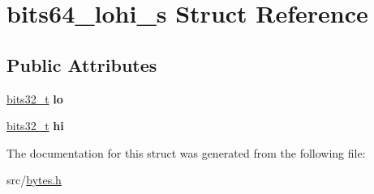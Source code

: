 \hypertarget{structbits64__lohi__s}{}\section{bits64\+\_\+lohi\+\_\+s Struct Reference}
\label{structbits64__lohi__s}
\subsection*{Public Attributes}
\begin{DoxyCompactItemize}
\item 
\hypertarget{structbits64__lohi__s_a2a6a22a377dc61c098602dd961b8c1f2}{}\label{structbits64__lohi__s_a2a6a22a377dc61c098602dd961b8c1f2} 
\hyperlink{unionbits32__t}{bits32\+\_\+t} {\bfseries lo}
\item 
\hypertarget{structbits64__lohi__s_adbca1ef7d341b9db5e1ab0f48ce04601}{}\label{structbits64__lohi__s_adbca1ef7d341b9db5e1ab0f48ce04601} 
\hyperlink{unionbits32__t}{bits32\+\_\+t} {\bfseries hi}
\end{DoxyCompactItemize}


The documentation for this struct was generated from the following file\+:\begin{DoxyCompactItemize}
\item 
src/\hyperlink{bytes_8h}{bytes.\+h}\end{DoxyCompactItemize}
